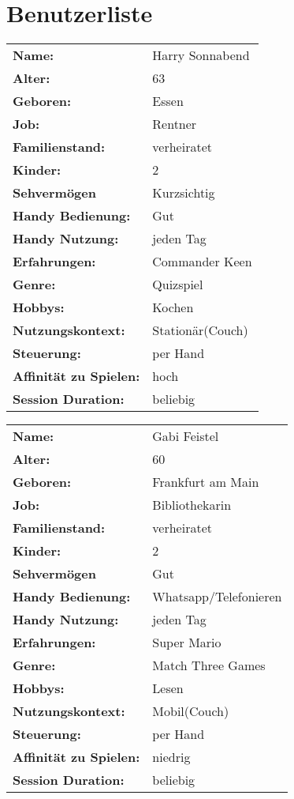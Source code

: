 \documentclass[12pt, a4paper]{article}
\begin{document}
\newpage
\section{Benutzerliste}

\begin{table}[H]
\begin{tabular}[h]{|l l|}
\hline
\textbf{Name:} & Harry Sonnabend\\
\textbf{Alter:} & 63\\
\textbf{Geboren:} & Essen\\
\textbf{Job:} & Rentner\\
\textbf{Familienstand:} & verheiratet\\
\textbf{Kinder:} & 2\\
\textbf{Sehvermögen} & Kurzsichtig\\
\textbf{Handy Bedienung:} & Gut\\
\textbf{Handy Nutzung:} & jeden Tag\\
\textbf{Erfahrungen:} & Commander Keen\\
\textbf{Genre:} & Quizspiel\\
\textbf{Hobbys:} & Kochen\\
\textbf{Nutzungskontext:} & Stationär(Couch)\\
\textbf{Steuerung:} & per Hand\\
\textbf{Affinität zu Spielen:} & hoch\\
\textbf{Session Duration:} & beliebig\\
\hline
\end{tabular}
\end{table}

\par\bigskip

\begin{table}[H]
\begin{tabular}[h]{|l l|}
\hline
\textbf{Name:} & Gabi Feistel\\
\textbf{Alter:} & 60\\
\textbf{Geboren:} & Frankfurt am Main\\
\textbf{Job:} & Bibliothekarin\\
\textbf{Familienstand:} & verheiratet\\
\textbf{Kinder:} & 2\\
\textbf{Sehvermögen} & Gut\\
\textbf{Handy Bedienung:} & Whatsapp/Telefonieren\\
\textbf{Handy Nutzung:} & jeden Tag\\
\textbf{Erfahrungen:} & Super Mario\\
\textbf{Genre:} & Match Three Games\\
\textbf{Hobbys:} & Lesen\\
\textbf{Nutzungskontext:} & Mobil(Couch)\\
\textbf{Steuerung:} & per Hand\\
\textbf{Affinität zu Spielen:} & niedrig\\
\textbf{Session Duration:} & beliebig\\
\hline
\end{tabular}
\end{table}
\end{document}
